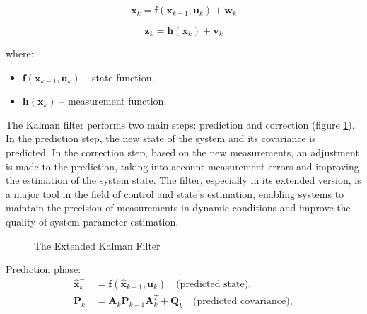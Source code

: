 \begin{equation}
	\bm{x}_k =  \bm{f} \left( \bm{x}_{k-1},  \bm{u}_k \right) + \bm{w}_k
	\label{ekf1}
\end{equation}

\begin{equation}
	\bm{z}_k = \bm{h} \left(\bm{x}_k \right) + \bm{v}_k
	\label{ekf2}
\end{equation}


where:
\begin{itemize}
	\item $\bm{f} \left( \bm{x}_{k-1},  \bm{u}_k \right)$ -- state function, 
	\item $\bm{h} \left(\bm{x}_k \right)$ -- measurement function.
\end{itemize}

The Kalman filter performs two main steps: prediction and correction (figure \ref{kf_diagram}). In the prediction step, the new state of the system and its covariance is predicted. In the correction step, based on the new measurements, an adjustment is made to the prediction, taking into account measurement errors and improving the estimation of the system state. The filter, especially in its extended version, is a major tool in the field of control and state's estimation, enabling systems to maintain the precision of measurements in dynamic conditions and improve the quality of system parameter estimation.\\


\begin{figure}[!h]
	\centering
	\caption{The Extended Kalman Filter}
	\label{kf_diagram}
\end{figure}

Prediction phase:
\begin{align}
	\bm{\hat{x}}_k^- & = \bm{f}(\bm{\hat{x}}_{k-1}, \bm{u}_k) \quad \text{(predicted state)}, \\
	\bm{P}_k^- & = \bm{A}_k \bm{P}_{k-1} \bm{A}_k^T + \bm{Q}_k \quad \text{(predicted covariance)},
\end{align}

